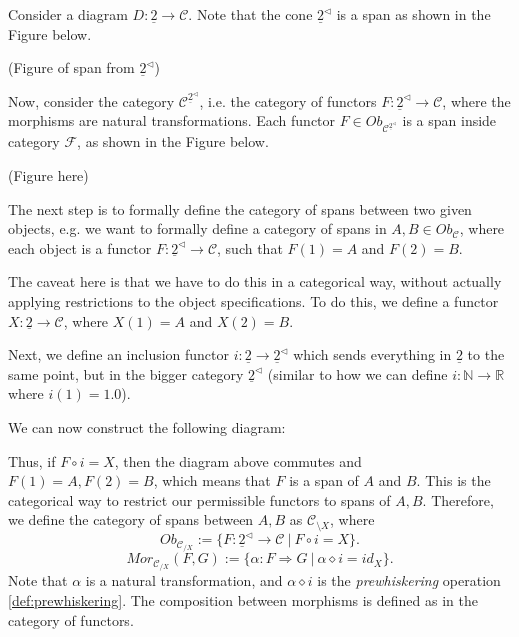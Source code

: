 \begin{example}
  Consider a diagram $D:\underline{2}\to \mathcal C$. Note that
  the cone $\underline{2}^{\lhd}$ is a span as shown in the Figure below.

  (Figure of span from $\underline{2}^{\lhd}$)

  Now, consider the category $\mathcal C^{\underline{2}^{\lhd}}$, i.e.
  the category of functors $F:\underline{2}^{\lhd} \to \mathcal C$,
  where the morphisms are natural transformations.
  Each functor $F \in Ob_{\mathcal C^{\underline{2}^{\lhd}}}$
  is a span inside category $\mathcal F$, as shown in the Figure below.

  (Figure here)

  The next step is to formally define the category of spans between two given objects,
  e.g. we want to formally define a category of spans in $A, B \in Ob_\mathcal C$,
  where each object is a functor $F:\underline{2}^{\lhd}\to \mathcal C$,
  such that $F(1) = A$ and $F(2) = B$.

  The caveat here is that we have to do this in a categorical way, without actually applying restrictions
  to the object specifications. To do this, we define a functor
  $X:\underline{2} \to \mathcal C$, where $X(1) = A$ and $X(2)= B$.

  Next, we define an inclusion functor $i: \underline{2} \to \underline{2}^{\lhd}$ which sends
  everything in $\underline{2}$ to the same point, but in the bigger category $\underline{2}^{\lhd}$
  (similar to how we can define $i: \mathbb N \to \mathbb R$ where $i(1) = 1.0$).

  We can now construct the following diagram:
  
  Thus, if $F\circ i = X$, then the diagram above commutes and $F(1) = A, F(2) = B$, which means
  that $F$ is a span of $A$ and $B$. This is the categorical way to restrict our permissible functors
  to spans of $A,B$. Therefore, we define the category of spans between $A,B$ as
  $\mathcal C_{\setminus X}$, where
  \begin{displaymath}
    Ob_{\mathcal C_{/ X}}:=\{
      F: \underline{2}^\lhd \to \mathcal C \ | \ F \circ i = X
    \}.
  \end{displaymath}
  \begin{displaymath}
    Mor_{\mathcal C_{/X}}(F,G):=\{
      \alpha: F \Rightarrow G \ | \ \alpha \diamond i = id_{X}
    \}.
  \end{displaymath}
  Note that $\alpha$ is a natural transformation, and $\alpha \diamond i$ is the \textit{prewhiskering}
  operation \ref{def:prewhiskering}. The composition between morphisms is defined as in the category of functors.


\end{example}
